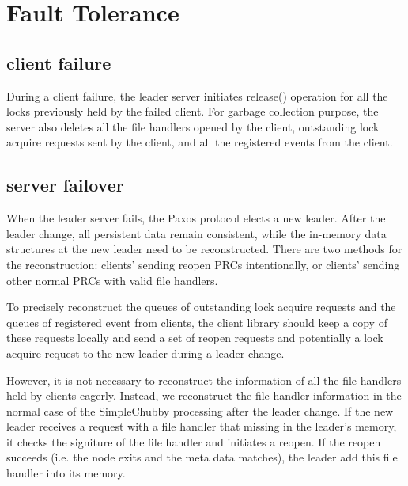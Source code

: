 \section{Fault Tolerance}
\subsection{client failure}

During a client failure, the leader server initiates release() operation for
all the locks previously held by the failed client. For garbage collection
purpose, the server also deletes all the file handlers opened by the client,
outstanding lock acquire requests sent by the client, and all the registered
events from the client.


\subsection{server failover}

When the leader server fails, the Paxos protocol elects a new leader. After
the leader change, all persistent data remain consistent, while the in-memory
data structures at the new leader need to be reconstructed. There are two
methods for the reconstruction: clients' sending reopen PRCs intentionally,
or clients' sending other normal PRCs with valid file handlers.

To precisely reconstruct the queues of outstanding lock acquire requests and
the queues of registered event from clients, the client library should keep
a copy of these requests locally and send a set of reopen requests and
potentially a lock acquire request to the new leader during a leader change.

However, it is not necessary to reconstruct the information of all the file
handlers held by clients eagerly. Instead, we reconstruct the file handler
information in the normal case of the SimpleChubby processing after the
leader change. If the new leader receives a request with a file handler that
missing in the leader's memory, it checks the signiture of the file
handler and initiates a reopen. If the reopen succeeds (i.e. the node exits
and the meta data matches), the leader add this file handler into its memory.


